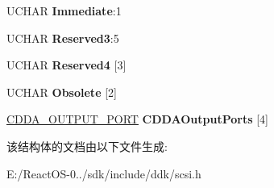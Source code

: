 \begin{DoxyCompactItemize}
U\+C\+H\+AR {\bfseries Immediate}\+:1
\item 
\mbox{\label{struct___c_d_a_u_d_i_o___c_o_n_t_r_o_l___p_a_g_e_a4e84288292f3f8597fd162d7e79f9499}} 
U\+C\+H\+AR {\bfseries Reserved3}\+:5
\item 
\mbox{\label{struct___c_d_a_u_d_i_o___c_o_n_t_r_o_l___p_a_g_e_af8ede9aa3df9ff586649e502f8397c68}} 
U\+C\+H\+AR {\bfseries Reserved4} \mbox{[}3\mbox{]}
\item 
\mbox{\label{struct___c_d_a_u_d_i_o___c_o_n_t_r_o_l___p_a_g_e_a53e821b98a1a90695eb5a0d33969a295}} 
U\+C\+H\+AR {\bfseries Obsolete} \mbox{[}2\mbox{]}
\item 
\mbox{\label{struct___c_d_a_u_d_i_o___c_o_n_t_r_o_l___p_a_g_e_ab41963933519271c6093263069f7dcc7}} 
\hyperlink{struct___c_d_d_a___o_u_t_p_u_t___p_o_r_t}{C\+D\+D\+A\+\_\+\+O\+U\+T\+P\+U\+T\+\_\+\+P\+O\+RT} {\bfseries C\+D\+D\+A\+Output\+Ports} \mbox{[}4\mbox{]}
\end{DoxyCompactItemize}


该结构体的文档由以下文件生成\+:\begin{DoxyCompactItemize}
\item 
E\+:/\+React\+O\+S-\/0../sdk/include/ddk/scsi.\+h\end{DoxyCompactItemize}
